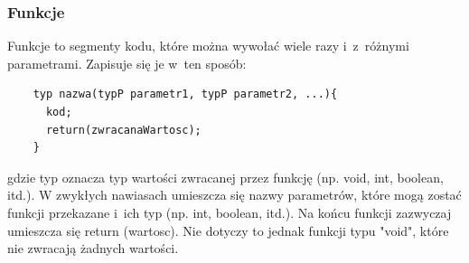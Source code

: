 \documentclass[a4paper,12pt, twoside]{article}
\begin{document}
\subsubsection{Funkcje}
	Funkcje to segmenty kodu, które można wywołać wiele razy i~z~różnymi parametrami.
	Zapisuje się je w~ten sposób:
	\begin{verbatim}
	typ nazwa(typP parametr1, typP parametr2, ...){
	  kod;
	  return(zwracanaWartosc);
	}
	\end{verbatim}
	gdzie typ oznacza typ wartości zwracanej przez funkcję (np. void, int, boolean, itd.).
	W zwykłych nawiasach umieszcza się nazwy parametrów, które mogą zostać funkcji przekazane i~ich typ (np. int, boolean, itd.). Na końcu funkcji zazwyczaj umieszcza się return (wartosc). Nie dotyczy to jednak funkcji typu "void", które nie zwracają żadnych wartości.
	
\end{document}
